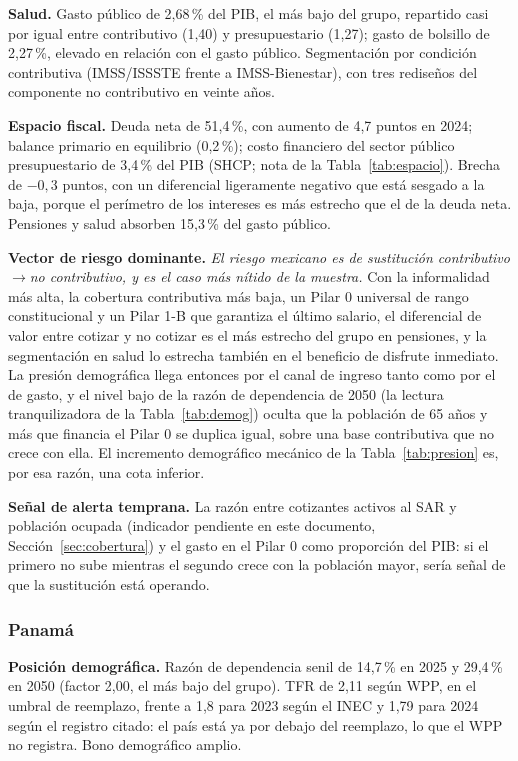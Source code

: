 \documentclass[12pt, letterpaper]{article}
\begin{document}
\textbf{Salud.} Gasto público de 2,68\,\% del PIB, el más bajo del grupo, repartido
casi por igual entre contributivo (1,40) y presupuestario (1,27); gasto de
bolsillo de 2,27\,\%, elevado en relación con el gasto público. Segmentación por
condición contributiva (IMSS/ISSSTE frente a IMSS-Bienestar), con tres rediseños
del componente no contributivo en veinte años.

\textbf{Espacio fiscal.} Deuda neta de 51,4\,\%, con aumento de 4,7 puntos en 2024;
balance primario en equilibrio (0,2\,\%); costo financiero del sector público
presupuestario de 3,4\,\% del PIB (SHCP; nota de la Tabla~\ref{tab:espacio}).
Brecha de $-0{,}3$ puntos, con un diferencial ligeramente negativo que está sesgado a
la baja, porque el perímetro de los intereses es más estrecho que el de la deuda
neta. Pensiones y salud absorben 15,3\,\% del
gasto público.

\textbf{Vector de riesgo dominante.} \emph{El riesgo mexicano es de sustitución
contributivo$\rightarrow$no contributivo, y es el caso más nítido de la muestra.}
Con la informalidad más alta, la cobertura contributiva más baja, un Pilar 0
universal de rango constitucional y un Pilar 1-B que garantiza el último salario,
el diferencial de valor entre cotizar y no cotizar es el más estrecho del grupo en
pensiones, y la segmentación en salud lo estrecha también en el beneficio de
disfrute inmediato. La presión demográfica llega entonces por el canal de ingreso
tanto como por el de gasto, y el nivel bajo de la razón de dependencia de 2050
(la lectura tranquilizadora de la Tabla~\ref{tab:demog}) oculta que la
población de 65 años y más que financia el Pilar 0 se duplica igual, sobre una base
contributiva que no crece con ella. El incremento demográfico mecánico de la
Tabla~\ref{tab:presion} es, por esa razón, una cota inferior.

\textbf{Señal de alerta temprana.} La razón entre cotizantes activos al SAR y
población ocupada (indicador pendiente en este documento, Sección~\ref{sec:cobertura})
y el gasto en el Pilar 0 como proporción del PIB: si el primero no sube mientras el
segundo crece con la población mayor, sería señal de que la sustitución está
operando.

\subsubsection{Panamá}

\textbf{Posición demográfica.} Razón de dependencia senil de 14,7\,\% en 2025 y
29,4\,\% en 2050 (factor 2,00, el más bajo del grupo). TFR de 2,11 según WPP, en el
umbral de reemplazo, frente a 1,8 para 2023 según el INEC y 1,79 para 2024 según el
registro citado: el país está ya por debajo del reemplazo, lo que el WPP no
registra. Bono demográfico amplio.
\end{document}
